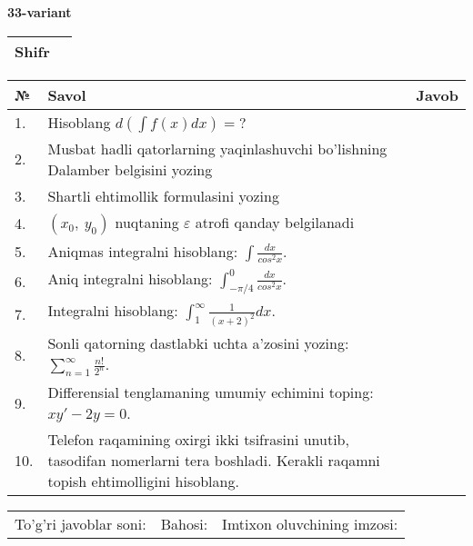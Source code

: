 \documentclass{article}
\begin{document}
  \egroup
  
  \newpage
  
  
  \textbf{33-variant}\\
  
  \bgroup
  \def\arraystretch{1.6} %
  
  \begin{tabular}{|m{5.7cm}|m{9.5cm}|}
  \hline
  Shifr & \\
  \hline
  \end{tabular}
  
  \vspace{1cm}
  
  \begin{tabular}{|m{0.7cm}|m{10cm}|m{4cm}|}
  \hline
  № & Savol & Javob \\
  \hline
  1. & Hisoblang \(d\left( \int {f(x)dx} \right) = ?\) &  \\
  \hline
  2. & Musbat hadli qatorlarning yaqinlashuvchi bo'lishning Dalamber belgisini yozing &  \\
  \hline
  3. & Shartli ehtimollik formulasini yozing &  \\
  \hline
  4. & \((x_{0},\ y_{0})\) nuqtaning \(\varepsilon\) atrofi qanday belgilanadi &  \\
  \hline
  5. & Aniqmas integralni hisoblang: \(\int \frac{dx}{cos^{2}x}\). &  \\
  \hline
  6. & Aniq integralni hisoblang: \(\int_{- \pi/4}^{0}\frac{dx}{cos^{2}x}\). &  \\
  \hline
  7. & Integralni hisoblang: \(\int_{1}^{\infty}{\frac{1}{(x + 2)^{2}}dx}\). &  \\
  \hline
  8. & Sonli qatorning dastlabki uchta a'zosini yozing: \(\sum_{n = 1}^{\infty}\frac{n!}{2^{n}}\). &  \\
  \hline
  9. & Differensial tenglamaning umumiy echimini toping: \(xy' - 2y = 0\). &  \\
  \hline
  10. & Telefon raqamining oxirgi ikki tsifrasini unutib, tasodifan nomerlarni tera boshladi. Kerakli raqamni topish ehtimolligini hisoblang. &  \\
  \hline
  \end{tabular}
  
  \vspace{1cm}
  
  \begin{tabular}{lll}
  To'g'ri javoblar soni: \underline{\hspace{1.5cm}} & 
  Bahosi: \underline{\hspace{1.5cm}} & 
  Imtixon oluvchining imzosi: \underline{\hspace{2cm}} \\
  \end{tabular}
  
\end{document}

